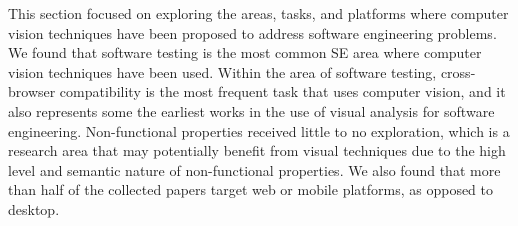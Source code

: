This section focused on exploring the 
areas, tasks, and platforms 
where computer vision techniques have 
been proposed to address software engineering problems.
We found that software testing is the most common 
SE area where computer vision techniques
have been used. 
Within the area of software testing, 
cross-browser compatibility is the most 
frequent task that uses computer vision, and it also 
represents some the earliest works in the use of visual analysis 
for software engineering. 
Non-functional properties received little to no exploration, 
which is a research area that may potentially benefit from visual 
techniques due to the high level and semantic nature of non-functional properties. 
We also found that more than half of the collected papers 
target web or mobile platforms, as opposed to desktop.


